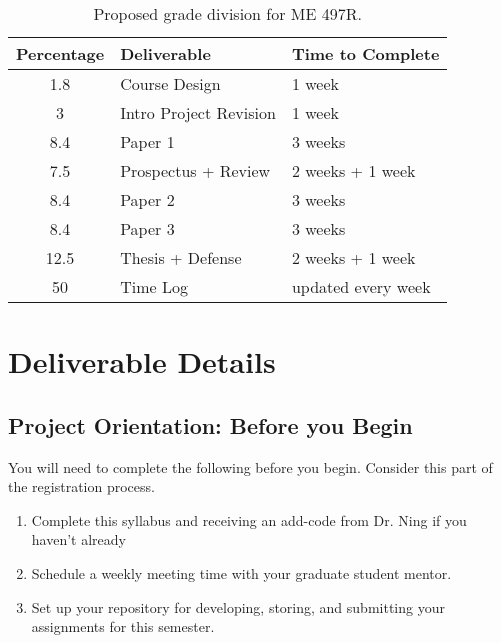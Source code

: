 \documentclass[12pt]{article}
\begin{document}
\begin{table}[h!]
	\centering
	\caption{Proposed grade division for ME 497R.}
	\label{tab:rubric}
	\renewcommand{\arraystretch}{1.2}
	\vspace{1em}
	\begin{tabular}{c|l|l}
		\textbf{Percentage} & \textbf{Deliverable} & \textbf{Time to Complete}\\ 
		\hline
		1.8 & Course Design & 1 week \\
		3 & Intro Project Revision & 1 week\\
		8.4 & Paper 1 & 3 weeks \\
		7.5 & Prospectus + Review & 2 weeks + 1 week\\
		8.4 & Paper 2 & 3 weeks\\
		8.4 & Paper 3 & 3 weeks\\
		12.5 & Thesis + Defense & 2 weeks + 1 week\\
		50 & Time Log & updated every week	
	\end{tabular}
\end{table}





\section{Deliverable Details}
\label{sec:deliverables}


\subsection{Project Orientation: Before you Begin}
\label{ssec:orientation}

You will need to complete the following before you begin.  Consider this part of the registration process.

\begin{enumerate}
	\item Complete this syllabus and receiving an add-code from Dr. Ning if you haven't already
	\item Schedule a weekly meeting time with your graduate student mentor.
	\item Set up your repository for developing, storing, and submitting your assignments for this semester. 
\end{enumerate}
\end{document}
